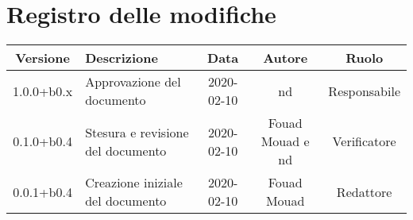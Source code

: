 \section*{Registro delle modifiche}

\begin{center}
	\begin{longtable}{|c|p{3cm}|c|c|c|}
	\hline
	\rowcolor{lighter-grayer}
	\textbf{Versione} & \textbf{Descrizione} & \textbf{Data} & \textbf{Autore} & \textbf{Ruolo} \\
	\hline
	\endfirsthead


	1.0.0+b0.x & Approvazione del documento & 2020-02-10 & nd & Responsabile \\
	\hline
	0.1.0+b0.4 & Stesura e revisione del documento & 2020-02-10 & Fouad Mouad e nd & Verificatore \\
	\hline
	0.0.1+b0.4 & Creazione iniziale del documento & 2020-02-10 & Fouad Mouad & Redattore \\
	\hline

	\end{longtable}
\end{center}
